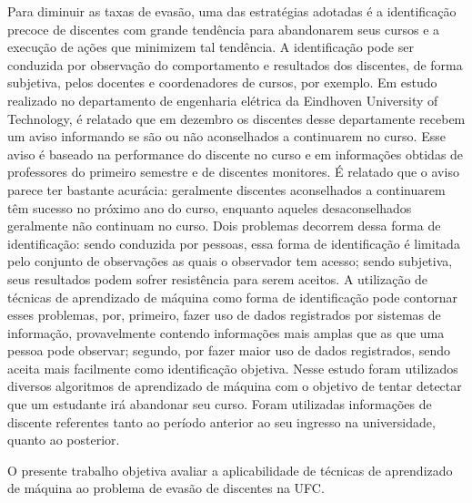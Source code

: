 Para diminuir as taxas de evasão, uma das estratégias adotadas é a identificação precoce de discentes com grande tendência para abandonarem seus cursos e a execução de ações que minimizem tal tendência. A identificação pode ser conduzida por observação do comportamento e resultados dos discentes, de forma subjetiva, pelos docentes e coordenadores de cursos, por exemplo. Em estudo realizado no departamento de engenharia elétrica da Eindhoven University of Technology\cite{Predicting_Students}, é relatado que em dezembro os discentes desse departamente recebem um aviso informando se são ou não aconselhados a continuarem no curso. Esse aviso é baseado na performance do discente no curso e em informações obtidas de professores do primeiro semestre e de discentes monitores. É relatado que o aviso parece ter bastante acurácia: geralmente discentes aconselhados a continuarem têm sucesso no próximo ano do curso, enquanto aqueles desaconselhados geralmente não continuam no curso.
Dois problemas decorrem dessa forma de identificação: sendo conduzida por pessoas, essa forma de identificação é limitada pelo conjunto de observações as quais o observador tem acesso; sendo subjetiva, seus resultados podem sofrer resistência para serem aceitos. A utilização de técnicas de aprendizado de máquina como forma de identificação pode contornar esses problemas, por, primeiro, fazer uso de dados registrados por sistemas de informação, provavelmente contendo informações mais amplas que as que uma pessoa pode observar; segundo, por fazer maior uso de dados registrados, sendo aceita mais facilmente como identificação objetiva. Nesse estudo foram utilizados diversos algoritmos de aprendizado de máquina com o objetivo de tentar detectar que um estudante irá abandonar seu curso. Foram utilizadas informações de discente referentes tanto ao período anterior ao seu ingresso na universidade, quanto ao posterior.



O presente trabalho objetiva avaliar a aplicabilidade de técnicas de aprendizado de máquina ao problema de evasão de discentes na UFC.